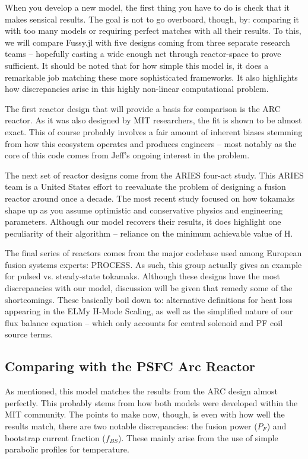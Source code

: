 When you develop a new model, the first thing you have to do is check that it makes sensical results. The goal is not to go overboard, though, by: comparing it with too many models or requiring perfect matches with all their results. To this, we will compare Fussy.jl with five designs coming from three separate research teams -- hopefully casting a wide enough net through reactor-space to prove sufficient. It should be noted that for how simple this model is, it does a remarkable job matching these more sophisticated frameworks. It also highlights how discrepancies arise in this highly non-linear computational problem.

The first reactor design that will provide a basis for comparison is the ARC reactor. As it was also designed by MIT researchers, the fit is shown to be almost exact. This of course probably involves a fair amount of inherent biases stemming from how this ecosystem operates and produces engineers -- most notably as the core of this code comes from Jeff's ongoing interest in the problem.

The next set of reactor designs come from the ARIES four-act study. This ARIES team is a United States effort to reevaluate the problem of designing a fusion reactor around once a decade. The most recent study focused on how tokamaks shape up as you assume optimistic and conservative physics and engineering parameters. Although our model recovers their results, it does highlight one peculiarity of their algorithm -- reliance on the minimum achievable value of H.

The final series of reactors comes from the major codebase used among European fusion systems experts: PROCESS. As such, this group actually gives an example for pulsed vs. steady-state tokamaks. Although these designs have the most discrepancies with our model, discussion will be given that remedy some of the shortcomings. These basically boil down to: alternative definitions for heat loss appearing in the ELMy H-Mode Scaling, as well as the simplified nature of our flux balance equation -- which only accounts for central solenoid and PF coil source terms. 

\newpage 

\subsection{Comparing with the PSFC Arc Reactor}

As mentioned, this model matches the results from the ARC design almost perfectly. This probably stems from how both models were developed within the MIT community.  The points to make now, though, is even with how well the results match, there are two notable discrepancies: the fusion power ($P_F$) and bootstrap current fraction ($f_{BS}$). These mainly arise from the use of simple parabolic profiles for temperature.

